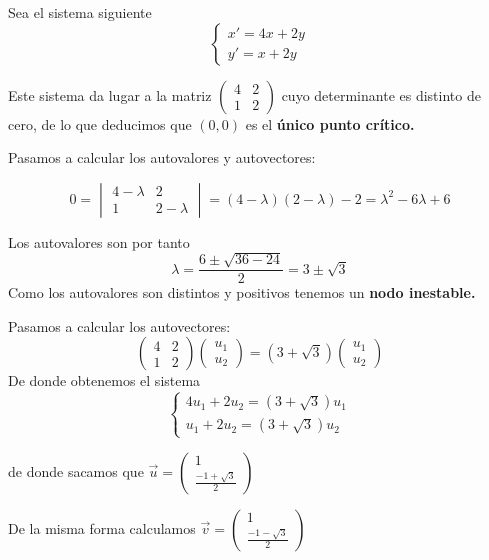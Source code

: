 \begin{example}
Sea el sistema siguiente
\begin{equation*}
\left\lbrace 
\begin{array}{l}
	x' = 4x+2y\\
	y'=x+2y
\end{array}
\right. 
\end{equation*}

Este sistema da lugar a la matriz $\begin{pmatrix}
4& 2\\1& 2
\end{pmatrix}$
cuyo determinante es distinto de cero, de lo que deducimos que $(0,0)$ es el \textbf{único punto crítico.}

Pasamos a calcular los autovalores y autovectores:

$$0 = \begin{vmatrix}
4-\lambda& 2\\1& 2-\lambda
\end{vmatrix} = (4-\lambda)(2-\lambda)-2 = \lambda^2-6\lambda+6$$

Los autovalores son por tanto
$$\lambda = \frac{6\pm \sqrt{36-24}}{2} = 3\pm \sqrt{3}$$
Como los autovalores son distintos y positivos tenemos un \textbf{nodo inestable.}

Pasamos a calcular los autovectores:
$$\begin{pmatrix}
4& 2\\1& 2
\end{pmatrix}\begin{pmatrix}
u_1\\ u_2
\end{pmatrix}=(3+\sqrt{3})\begin{pmatrix}
u_1\\ u_2
\end{pmatrix}$$
De donde obtenemos el sistema 
\begin{equation*}
\left\lbrace 
\begin{array}{l}
	4u_1+2u_2=(3+\sqrt{3})u_1\\
	u_1+2u_2 = (3+\sqrt{3})u_2
\end{array}
\right. 
\end{equation*}

de donde sacamos que $\vec{u} = \begin{pmatrix}
1\\\frac{-1+\sqrt{3}}{2}
\end{pmatrix}$

De la misma forma calculamos $\vec{v} = \begin{pmatrix}
1\\\frac{-1-\sqrt{3}}{2}
\end{pmatrix}$


\end{example}
